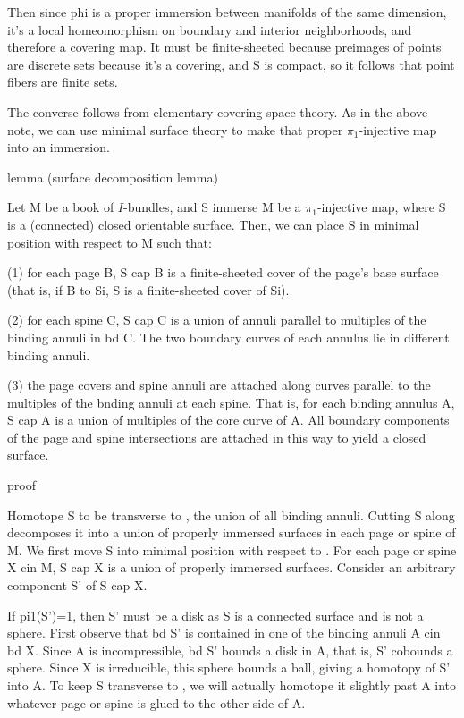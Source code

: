 Then since phi is a proper immersion between manifolds of the same dimension,
it's a local homeomorphism on boundary and interior neighborhoods, and
therefore a covering map. It must be finite-sheeted because preimages of points
are discrete sets because it's a covering, and S is compact, so it follows that
point fibers are finite sets.

The converse follows from elementary covering space theory. As in the above
note, we can use minimal surface theory to make that proper $\pi_1$-injective map
into an immersion.

lemma (surface decomposition lemma)

Let M be a book of $I$-bundles, and S immerse M be a $\pi_1$-injective map, where
S is a (connected) closed orientable surface.  Then, we can place S in minimal
position with respect to M such that:

(1) for each page B, S cap B is a finite-sheeted cover of the page's base
surface (that is, if B to Si, S is a finite-sheeted cover of Si).

(2) for each spine C, S cap C is a union of annuli parallel to multiples of the
binding annuli in bd C. The two boundary curves of each annulus lie in
different binding annuli.

(3) the page covers and spine annuli are attached along curves parallel to the
multiples of the bnding annuli at each spine. That is, for each binding annulus
A, S cap A is a union of multiples of the core curve of A. All boundary
components of the page and spine intersections are attached in this way to
yield a closed surface.

proof

Homotope S to be transverse to \cA, the union of all binding annuli. Cutting
S along \cA decomposes it into a union of properly immersed surfaces in each
page or spine of M. We first move S into minimal position with respect to \cA.
For each page or spine X cin M, S cap X is a union of properly immersed
surfaces. Consider an arbitrary component S' of S cap X.

If pi1(S')=1, then S' must be a disk as S is a connected surface and is not
a sphere. First observe that bd S' is contained in one of the binding annuli
A cin bd X. Since A is incompressible, bd S' bounds a disk in A, that is, S'
cobounds a sphere. Since X is irreducible, this sphere bounds a ball, giving
a homotopy of S' into A. To keep S transverse to \cA, we will actually homotope
it slightly past A into whatever page or spine is glued to the other side of A.

